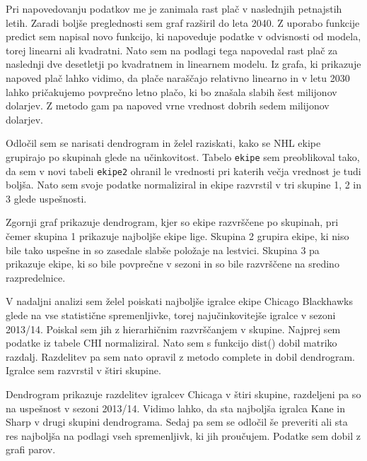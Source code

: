\documentclass[11pt,a4paper]{article}
\begin{document}

Pri napovedovanju podatkov me je zanimala rast plač v naslednjih petnajstih letih. Zaradi boljše preglednosti sem graf razširil do leta 2040. Z uporabo funkcije predict sem napisal novo funkcijo, ki napoveduje podatke v odvisnosti od modela, torej linearni ali kvadratni. Nato sem na podlagi tega napovedal rast plač za naslednji dve desetletji po kvadratnem in linearnem modelu. Iz grafa, ki prikazuje napoved plač lahko vidimo, da plače naraščajo relativno linearno in v letu 2030 lahko pričakujemo povprečno letno plačo, ki bo znašala slabih šest milijonov dolarjev. Z metodo gam pa napoved vrne vrednost dobrih sedem milijonov dolarjev.

 
Odločil sem se narisati dendrogram in želel raziskati, kako se NHL ekipe grupirajo po skupinah glede na učinkovitost. Tabelo \verb|ekipe| sem preoblikoval tako, da sem v novi tabeli \verb|ekipe2| ohranil le vrednosti pri katerih večja vrednost je tudi boljša. Nato sem svoje podatke normaliziral in ekipe razvrstil v tri skupine 1, 2 in 3 glede uspešnosti.


Zgornji graf prikazuje dendrogram, kjer so ekipe razvrščene po skupinah, pri čemer skupina 1 prikazuje najboljše ekipe lige. Skupina 2 grupira ekipe, ki niso bile tako uspešne in so zasedale slabše položaje na lestvici. Skupina 3 pa prikazuje ekipe, ki so bile povprečne v sezoni in so bile razvrščene na sredino razpredelnice.

V nadaljni analizi sem želel poiskati najboljše igralce ekipe Chicago Blackhawks glede na vse statistične spremenljivke, torej najučinkovitejše igralce v sezoni 2013/14. Poiskal sem jih z hierarhičnim razvrščanjem v skupine. Najprej sem podatke iz tabele CHI normaliziral. Nato sem s funkcijo dist() dobil matriko razdalj. Razdelitev pa sem nato opravil z metodo complete in dobil dendrogram. Igralce sem razvrstil v štiri skupine.


Dendrogram prikazuje razdelitev igralcev Chicaga v štiri skupine, razdeljeni pa so na uspešnost v sezoni 2013/14. Vidimo lahko, da sta najboljša igralca Kane in Sharp v drugi skupini dendrograma. Sedaj pa sem se odločil še preveriti ali sta res najboljša na podlagi vseh spremenljivk, ki jih proučujem. Podatke sem dobil z grafi parov.
\end{document}

